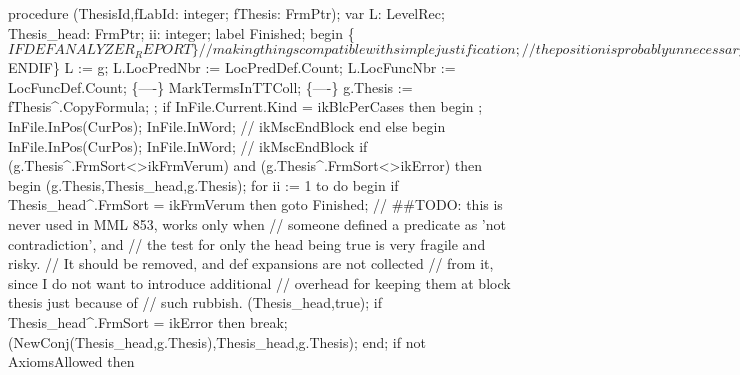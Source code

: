 \nwenddocs{}\endmoddef\nwstartdeflinemarkup{}\nwenddeflinemarkup
procedure (ThesisId,fLabId: integer; fThesis: FrmPtr);
var
   L: LevelRec;
   Thesis_head: FrmPtr;
   ii: integer;
label Finished;
begin
   \{$IFDEF ANALYZER_REPORT\}
   // making things compatible with simplejustification;
   // the position is probably unnecessary
   AReport.Out_Propos(ThesisId, fLabId, CurPos, fThesis);
   AReport.Out_XElStart(elProof);
   if ThesisId <> 0 then
   begin
      AReport.Out_XIntAttr(atNr, ThesisId);
      AReport.Out_XIntAttr(atVid, fLabId);
   end;
   AReport.Out_PosAsAttrs(CurPos);
   AReport.Out_XAttrEnd;
   AReport.Out_XElStart0(elBlockThesis);
   AReport.Out_Formula(fThesis);
   AReport.Out_XElEnd(elBlockThesis);
   \{$ENDIF\}
   L := g;
   L.LocPredNbr := LocPredDef.Count;
   L.LocFuncNbr := LocFuncDef.Count;
   \{----\}
   MarkTermsInTTColl;
   \{----\}
   g.Thesis := fThesis^.CopyFormula;
   ;
   if InFile.Current.Kind = ikBlcPerCases then
   begin
      ;
      InFile.InPos(CurPos); InFile.InWord; // ikMscEndBlock
   end
   else
   begin
      InFile.InPos(CurPos); InFile.InWord; // ikMscEndBlock
      if (g.Thesis^.FrmSort<>ikFrmVerum) and (g.Thesis^.FrmSort<>ikError) then
      begin
         (g.Thesis,Thesis_head,g.Thesis);
         for ii := 1 to  do
         begin
            if Thesis_head^.FrmSort = ikFrmVerum then goto Finished;
            // ##TODO: this is never used in MML 853, works only when
            //  someone defined a predicate as 'not contradiction', and
            // the test for only the head being true is very fragile and risky.
            // It should be removed, and def expansions are not collected
            // from it, since I do not want to introduce additional
            // overhead for keeping them at block thesis just because of
            // such rubbish.
            (Thesis_head,true);
            if Thesis_head^.FrmSort = ikError then break;
            (NewConj(Thesis_head,g.Thesis),Thesis_head,g.Thesis);
         end;
         if not AxiomsAllowed then
